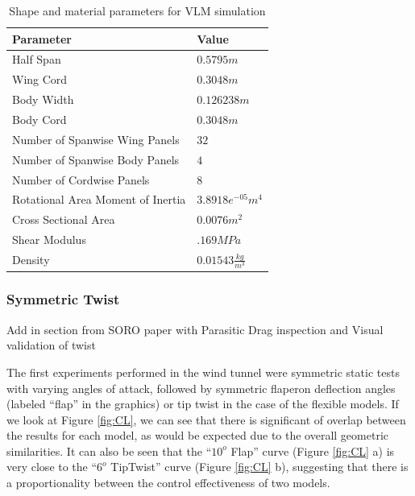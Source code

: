 \documentclass[11pt]{ucthesis}
\begin{document}
\begin{table}[h]
\begin{center}
\caption{Shape and material parameters for VLM simulation}
\label{tab:vlmConfig}
\begin{tabular}{  p{6cm} p{1.9cm}}
Parameter&Value\\\hline
Half Span&$0.5795m$\\
Wing Cord&$0.3048m$\\
Body Width&$0.126238m$\\
Body Cord&$0.3048m$\\
Number of Spanwise Wing Panels&$32$\\
Number of Spanwise Body Panels&$4$\\
Number of Cordwise Panels&$8$\\
Rotational Area Moment of Inertia&$3.8918e^{-05}m^4$\\
Cross Sectional Area&$0.0076m^2$\\
Shear Modulus&$.169 MPa$\\
Density&$0.01543\frac{kg}{m^3}$\\
\end{tabular}
\end{center}
\end{table}  

\subsubsection{Symmetric Twist}
{\color{red} Add in section from SORO paper with Parasitic Drag inspection and Visual validation of twist}

The first experiments performed in the wind tunnel were symmetric static tests with varying angles of attack, followed by symmetric flaperon deflection angles (labeled “flap” in the graphics) or tip twist in the case of the flexible models. If we look at Figure \ref{fig:CL}, we can see that there is significant of overlap between the results for each model, as would be expected due to the overall geometric similarities. It can also be seen that the “$10^o$ Flap” curve (Figure \ref{fig:CL} a) is very close to the “$6^o$ TipTwist” curve (Figure \ref{fig:CL} b), suggesting that there is a proportionality between the control effectiveness of two models.
\end{document}

